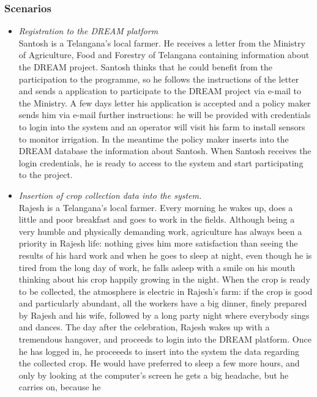 \documentclass[10pt]{article}
\begin{document}
\subsubsection{Scenarios}
\begin{itemize}
    \item \textit{Registration to the DREAM platform}\\ 
    Santosh is a Telangana's local farmer. He receives a letter from the Ministry of Agriculture, Food and Forestry of Telangana containing information
    about the DREAM project. Santosh thinks that he could benefit from the participation to the programme, so he follows the instructions of the letter and
    sends a application to participate to the DREAM project via e-mail to the Ministry. A few days letter his application is accepted and a policy maker sends him
    via e-mail further instructions: he will be provided with credentials to login into the system and an operator will visit his farm to install sensors to monitor
    irrigation. In the meantime the policy maker inserts into the DREAM database the information about Santosh. When Santosh receives the login credentials, he is 
    ready to access to the system and start participating to the project.
    \item \textit{Insertion of crop collection data into the system.}\\ 
    Rajesh is a Telangana's local farmer. Every morning he wakes up, does a little and poor breakfast and goes to work in the fields.
    Although being a very humble and physically demanding work, agriculture has always been a priority in Rajesh life: nothing gives him
    more satisfaction than seeing the results of his hard work and when he goes to sleep at night, even though he is tired from the long day of work,
    he falls asleep with a smile on his mouth thinking about his crop happily growing in the night. When the crop is ready to be collected, the atmosphere
    is electric in Rajesh's farm: if the crop is good and particularly abundant, all the workers have a big dinner, finely prepared by Rajesh and his wife,
    followed by a long party night where everybody sings and dances. The day after the celebration, Rajesh wakes up with a tremendous hangover, and proceeds
    to login into the DREAM platform. Once he has logged in, he proceeeds to insert into the system the data regarding the collected crop.
    He would have preferred to sleep a few more hours, and only by looking at the computer's screen he gets a big headache, but he carries on, because he

\end{itemize}
\end{document}
